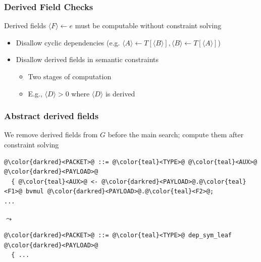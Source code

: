\documentclass[11pt,xcolor={dvipsnames},hyperref={pdftex,pdfpagemode=UseNone,hidelinks,pdfdisplaydoctitle=true},usepdftitle=false]{beamer}
\newcommand{\green}[1]{\textcolor{green!60!black}{#1}}
\newcommand{\blue}[1]{\textcolor{blue!70!black}{#1}}
\begin{document}
\begin{frame}
    \frametitle{Derived Field Checks}
    Derived fields \blue{$\langle F \rangle \leftarrow e$} must be computable \green{without constraint solving}\pause
    \begin{itemize}
        \item[1.] Disallow \green{cyclic dependencies} (e.g. \blue{$\langle A \rangle \leftarrow T[\langle B\rangle], \langle B\rangle \leftarrow T[\langle A\rangle]$})\pause
        \item[2.] Disallow derived fields in semantic constraints\pause
        \begin{itemize}
            \item Two stages of computation
            \item E.g., \blue{$\langle D \rangle > 0$} where \blue{$\langle D \rangle$} is derived
        \end{itemize}
    \end{itemize}
\end{frame}

\begin{frame}[fragile]
    \frametitle{Abstract derived fields}
We remove derived fields from \blue{$G$} before the main search; 
compute them after constraint solving\pause
\begin{lstlisting}[style=goblin]
@\color{darkred}<PACKET>@ ::= @\color{teal}<TYPE>@ @\color{teal}<AUX>@ @\color{darkred}<PAYLOAD>@
  { @\color{teal}<AUX>@ <- @\color{darkred}<PAYLOAD>@.@\color{teal}<F1>@ bvmul @\color{darkred}<PAYLOAD>@.@\color{teal}<F2>@;
...
\end{lstlisting}
\blue{$\leadsto$}
\begin{lstlisting}[style=goblin]
@\color{darkred}<PACKET>@ ::= @\color{teal}<TYPE>@ dep_sym_leaf @\color{darkred}<PAYLOAD>@
  { ...
\end{lstlisting}
\end{frame}
\end{document}
